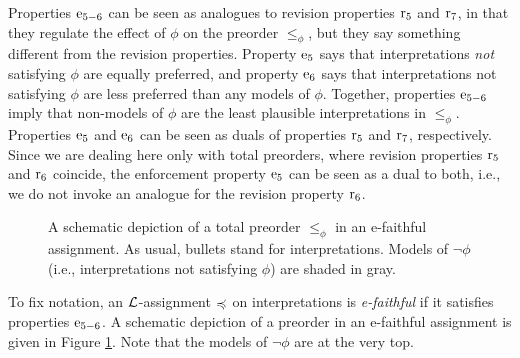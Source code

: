 Properties $\mathrm{e}_{5-6}$ can be seen as analogues to 
revision properties $\mathrm{r}_{5}$ and $\mathrm{r}_{7}$,
in that they regulate the effect of $\phi$
on the preorder $\le_{\phi}$,
but they say something different from the revision properties.
Property $\mathrm{e}_{5}$ says that interpretations 
\emph{not} satisfying $\phi$ are equally preferred,
and property $\mathrm{e}_{6}$ says that interpretations 
not satisfying $\phi $ are less preferred than 
any models of $\phi $.
Together, properties $\mathrm{e}_{5-6}$ imply that non-models of 
$\phi $ are the least plausible interpretations in $\le_\phi$.
Properties $\mathrm{e}_{5}$ and $\mathrm{e}_{6}$ can be seen as duals of 
properties $\mathrm{r}_{5}$ and $\mathrm{r}_{7}$, respectively.
Since we are dealing here only with total preorders, 
where revision properties $\mathrm{r}_{5}$ and $\mathrm{r}_{6}$ coincide,
the enforcement property $\mathrm{e}_{5}$ can be seen as a dual to both,
i.e., we do not invoke an analogue for the revision property $\mathrm{r}_{6}$.

\begin{figure}\centering
	\caption{
		A schematic depiction of a total preorder $\le_{\phi}$ 
		in an e-faithful assignment.
		As usual, bullets stand for interpretations.
		Models of $\lnot\phi$ (i.e., interpretations not satisfying $\phi$)
		are shaded in gray. 
	}
	\label{fig:3-enforcement-efaithful-schematic}
\end{figure}

To fix notation, an $\mathcal{L}$-assignment $\preccurlyeq$ on interpretations
is \emph{e-faithful} if it satisfies properties $\mathrm{e}_{5-6}$.
A schematic depiction of a preorder in an e-faithful 
assignment is given in Figure \ref{fig:3-enforcement-efaithful-schematic}.
Note that the models of $\lnot\phi$ are at the very top.


